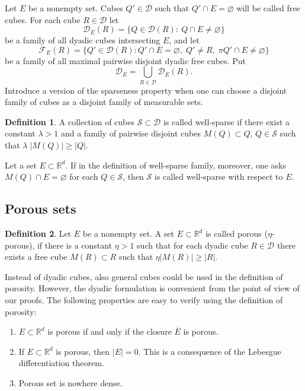 \documentclass[12pt]{amsart} \setlength{\textwidth}{15cm} \setlength{\textheight}{24cm} \setlength{\voffset}{-1cm} \setlength{\oddsidemargin}{-0.4cm} \setlength{\evensidemargin}{-0.4cm}
\theoremstyle{definition}
\newtheorem{df}{Definition}
\theoremstyle{remark}
\newcommand{\rd}{\mathbb{R}^d}
\begin{document}
Let $E$ be a nonempty set. Cubes $Q' \in \mathcal{D}$ such that
 $ Q' \cap E = \varnothing$ will be called free cubes.
  For each cube $R\in \mathcal{D}$  let
\[\mathcal{D}_E(R)=\{Q \in \mathcal{D}(R): \:  Q \cap E \neq \varnothing\}\]
be a family of all dyadic cubes intersecting $E$,
  and let
\[\mathcal{F}_E(R)= \{Q' \in \mathcal{D}(R): Q' \cap E = \varnothing, \;Q'\neq R,\;  \pi Q'\cap E \neq \varnothing\}\]
 be a family of all maximal   pairwise disjoint dyadic free cubes.
Put
  \[\mathcal{D}_E= \bigcup _{R\in \mathcal{D}} \mathcal{D}_E(R). \]
Introduce a   version of the sparseness property  when  one can choose a disjoint family of cubes as a disjoint family of measurable sets.
  \begin{df}
  A collection of cubes $\mathcal{S}\subset \mathcal{D}$ is called well-sparse
 if there exist  a constant $\lambda >1$ and  a family of  pairwise disjoint cubes
$M(Q) \subset Q$, $Q \in \mathcal{S}$  such that  $\lambda \;|M(Q)|\geq  |Q|$.

  Let a set $E\subset \rd$.  If in the definition of well-sparse family, moreover, one asks     $M(Q)\cap E=\varnothing$   for each  $Q \in \mathcal{S}$, then $\mathcal{S}$ is called well-sparse  with respect to $E$.
   \end{df}

 \subsection{Porous sets }
\begin{df}
  Let $E$ be a nonempty set.
  A set $E\subset\mathbb{R}^d$ is called  porous ($\eta$-porous), if there  is a constant $\eta > 1$ such that for each dyadic cube $R\in\mathcal{D} $ there exists a free cube     $M(R) \subset R$ such that $\eta |M(R)|\geq  |R|$.
   \end{df}
  Instead of dyadic cubes, also general cubes  could be used in the definition of
porosity. However, the dyadic formulation  is convenient from the point of view of our
proofs.
The following properties  are easy to verify using the definition of porosity:
\begin{enumerate}
   \item [P1.] $E\subset \rd$ is   porous if and only if the closure  $\overline{E}$ is porous.
  \item [P2.]If $E\subset \rd$ is  porous, then $|E|=0$. This is a consequence of the Lebesgue
differentiation theorem.
  \item [P3.]Porous set  is nowhere dense.
\end{enumerate}
\end{document}
